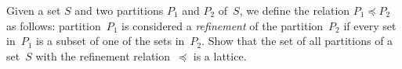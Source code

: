 \documentclass[a4paper,12pt]{article}
\begin{document}
\begin{tasks}
    \item Given a set $S$ and two partitions $P_1$ and $P_2$ of~$S$, we define the relation $P_1 \preceq P_2$ as follows: partition~$P_1$ is considered a \textit{refinement} of the partition~$P_2$ if every set in~$P_1$ is a subset of one of the sets in~$P_2$.
    Show that the set of all partitions of a set~$S$ with the refinement relation~$\preceq$ is a lattice.


\end{tasks}
\end{document}
